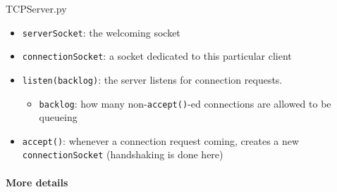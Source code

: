 \begin{frame}{TCPServer.py}
  \begin{center}
  \end{center}
  \begin{small}
    \begin{itemize}
    \item \texttt{serverSocket}: the welcoming socket
    \item \texttt{connectionSocket}: a socket dedicated to this particular client
    \item \texttt{listen(backlog)}: the server listens for connection requests.
      \begin{itemize}
      \item \texttt{backlog}: how many non-\texttt{accept()}-ed connections are allowed to be
        queueing
      \end{itemize}
    \item \texttt{accept()}: whenever a connection request coming, creates a new
      \texttt{connectionSocket} (handshaking is done here)
    \end{itemize}
  \end{small}
\end{frame}

\paragraph{More details}

